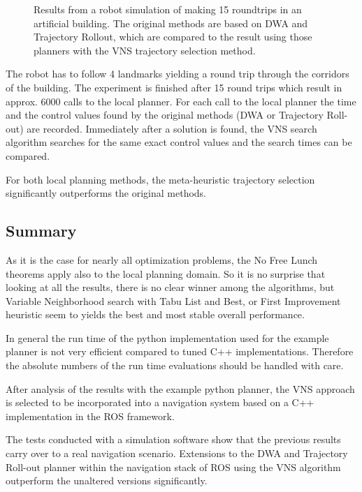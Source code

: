 \begin{figure}[thpb]
     \tiny
      \centering
      \myfloatalign
      \captionsetup[subfigure]{labelformat=empty} 
      \caption[Experiment: Robot simulation]{Results from a robot simulation of making 15 roundtrips in an artificial building. The original methods are based on DWA and Trajectory Rollout, which are compared to the result using those planners with the VNS trajectory selection method.}
      \label{fig:fig_simu}
\end{figure}

The robot has to follow 4 landmarks yielding a round trip through the corridors of the building.
The experiment is finished after 15 round trips which result in approx. 6000 calls to the local planner. 
For each call to the local planner the time and the control values found by the original methods (DWA or Trajectory Roll-out) are recorded. 
Immediately after a solution is found, the VNS search algorithm searches for the same exact control values and the search times can be compared. 

For both local planning methods, the meta-heuristic trajectory selection significantly outperforms the original methods.

\subsection{Summary}
As it is the case for nearly all optimization problems, the No Free Lunch theorems \cite{wolpert1997no} apply also to the local planning domain. 
So it is no surprise that looking at all the results, there is no clear winner among the algorithms, but Variable Neighborhood search with Tabu List and Best, or First Improvement heuristic seem to yields the best and most stable overall performance. 

In general the run time of the python implementation used for the example planner is not very efficient compared to tuned C++ implementations. 
Therefore the absolute numbers of the run time evaluations should be handled with care.

After analysis of the results with the example python planner, the VNS approach is selected to be incorporated into a navigation system based on a C++ implementation in the ROS framework.

The tests conducted with a simulation software show that the previous results carry over to a real navigation scenario. Extensions to the DWA and Trajectory Roll-out planner within the navigation stack of ROS using the VNS algorithm outperform the unaltered versions significantly.

